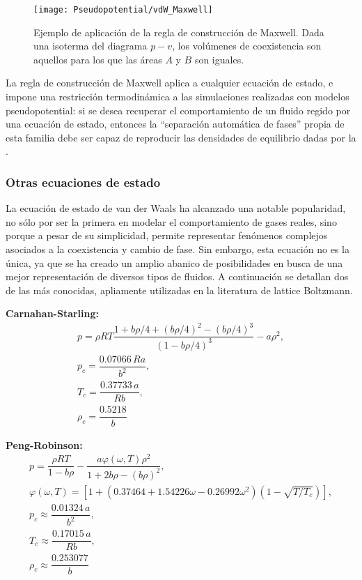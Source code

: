 \begin{figure}[ht]
	\centering
	\texttt{[image: Pseudopotential/vdW\_Maxwell]}
	\caption{Ejemplo de aplicaci\'on de la regla de construcci\'on de Maxwell. Dada una isoterma del diagrama $p-v$, los vol\'umenes de coexistencia son aquellos para los que las \'areas $A$ y $B$ son iguales.}
	\label{fig:vdW_Maxwell}
\end{figure}


La regla de construcci\'on de Maxwell aplica a cualquier ecuaci\'on de estado, e impone una restricci\'on termodin\'amica a las simulaciones realizadas con modelos pseudopotential: si se desea recuperar el comportamiento de un fluido regido por una ecuaci\'on de estado, entonces la ``separaci\'on autom\'atica de fases'' propia de esta familia debe ser capaz de reproducir las densidades de equilibrio dadas por la .


\subsubsection*{Otras ecuaciones de estado}

La ecuaci\'on de estado de van der Waals ha alcanzado una notable popularidad, no s\'olo por ser la primera en modelar el comportamiento de gases reales, sino porque a pesar de su simplicidad, permite representar fen\'omenos complejos asociados a la coexistencia y cambio de fase. Sin embargo, esta ecuaci\'on no es la \'unica, ya que se ha creado un amplio abanico de posibilidades en busca de una mejor representaci\'on de diversos tipos de fluidos. A continuaci\'on se detallan dos de las m\'as conocidas, apliamente utilizadas en la literatura de lattice Boltzmann.

\smallskip
\textbf{Carnahan-Starling:}
\begin{equation}
	\begin{gathered}
		p = \rho R T\dfrac{1+b\rho/4+(b\rho/4)^2-(b\rho/4)^3}{(1-b\rho/4)^3} - a\rho^2, \\[2mm]
		p_c = \dfrac{0.07066 \, Ra}{b^2}, \\[2mm]
		T_c = \dfrac{0.37733 \, a}{Rb}, \\[2mm]
		\rho_c = \dfrac{0.5218}{b}
	\end{gathered}
\end{equation}


\textbf{Peng-Robinson:}
\begin{equation}
	\begin{gathered}
		p = \dfrac{\rho R T}{1-b\rho} - \dfrac{a\varphi(\omega,T)\rho^2}{1+2b\rho-(b\rho)^2}, \\[0mm]
		\varphi(\omega,T) = \left[ 1+(0.37464+1.54226\omega-0.26992\omega^2)(1-\sqrt{T/T_c})\right], \\[0mm]
		p_c \approx \dfrac{0.01324 \, a}{b^2}, \\[2mm]
		T_c \approx \dfrac{0.17015 \, a}{Rb}, \\[2mm]
		\rho_c \approx \dfrac{0.253077}{b}
	\end{gathered}
\end{equation}

